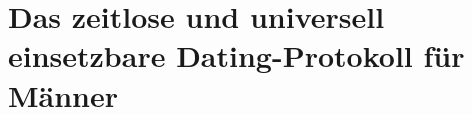\chapter{Das zeitlose und universell einsetzbare Dating-Protokoll für Männer}
\label{chapter-protokoll}